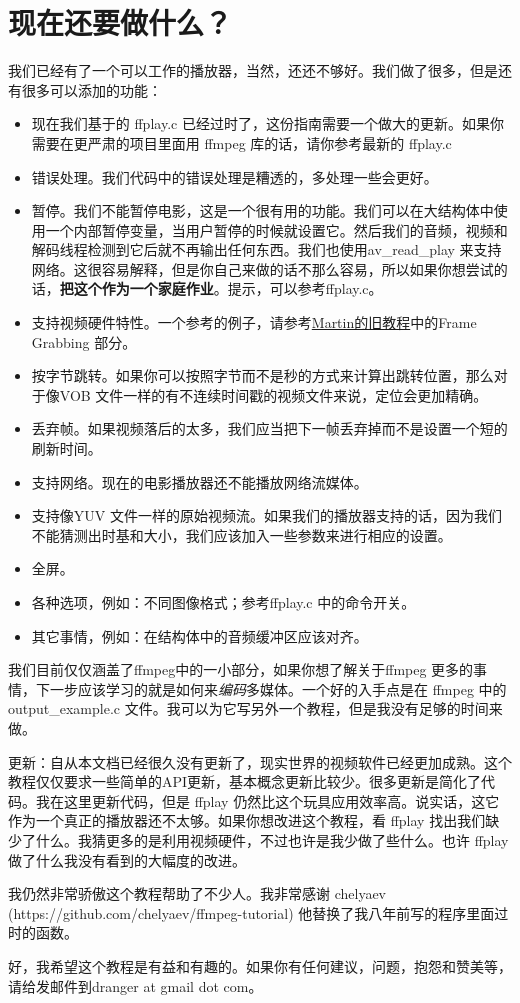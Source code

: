 ﻿\chapter*{现在还要做什么？}
\label{ch9}
我们已经有了一个可以工作的播放器，当然，还还不够好。我们做了很多，但是还有很多可以添加的功能：
\begin{itemize}
\item 现在我们基于的 ffplay.c 已经过时了，这份指南需要一个做大的更新。如果你需要在更严肃的项目里面用 ffmpeg 库的话，请你参考最新的 ffplay.c 
\item 错误处理。我们代码中的错误处理是糟透的，多处理一些会更好。
\item 暂停。我们不能暂停电影，这是一个很有用的功能。我们可以在大结构体中使用一个内部暂停变量，当用户暂停的时候就设置它。然后我们的音频，视频和解码线程检测到它后就不再输出任何东西。我们也使用av_read_play 来支持网络。这很容易解释，但是你自己来做的话不那么容易，所以如果你想尝试的话，\textbf{把这个作为一个家庭作业}。提示，可以参考ffplay.c。
\item 支持视频硬件特性。一个参考的例子，请参考\href{http://www.inb.uni-luebeck.de/~boehme/libavcodec_update.html}{Martin的旧教程}中的Frame Grabbing 部分。

\item 按字节跳转。如果你可以按照字节而不是秒的方式来计算出跳转位置，那么对于像VOB 文件一样的有不连续时间戳的视频文件来说，定位会更加精确。
\item 丢弃帧。如果视频落后的太多，我们应当把下一帧丢弃掉而不是设置一个短的刷新时间。
\item 支持网络。现在的电影播放器还不能播放网络流媒体。
\item 支持像YUV 文件一样的原始视频流。如果我们的播放器支持的话，因为我们不能猜测出时基和大小，我们应该加入一些参数来进行相应的设置。
\item 全屏。
\item 各种选项，例如：不同图像格式；参考ffplay.c 中的命令开关。
\item 其它事情，例如：在结构体中的音频缓冲区应该对齐。
\end{itemize}

我们目前仅仅涵盖了ffmpeg中的一小部分，如果你想了解关于ffmpeg 更多的事情，下一步应该学习的就是如何来\emph{编码}多媒体。一个好的入手点是在 ffmpeg 中的output_example.c 文件。我可以为它写另外一个教程，但是我没有足够的时间来做。

更新：自从本文档已经很久没有更新了，现实世界的视频软件已经更加成熟。这个教程仅仅要求一些简单的API更新，基本概念更新比较少。很多更新是简化了代码。我在这里更新代码，但是 ffplay 仍然比这个玩具应用效率高。说实话，这它作为一个真正的播放器还不太够。如果你想改进这个教程，看 ffplay 找出我们缺少了什么。我猜更多的是利用视频硬件，不过也许是我少做了些什么。也许 ffplay 做了什么我没有看到的大幅度的改进。

我仍然非常骄傲这个教程帮助了不少人。我非常感谢 chelyaev (https://github.com/chelyaev/ffmpeg-tutorial) 他替换了我八年前写的程序里面过时的函数。

好，我希望这个教程是有益和有趣的。如果你有任何建议，问题，抱怨和赞美等，请给发邮件到dranger at gmail dot com。

